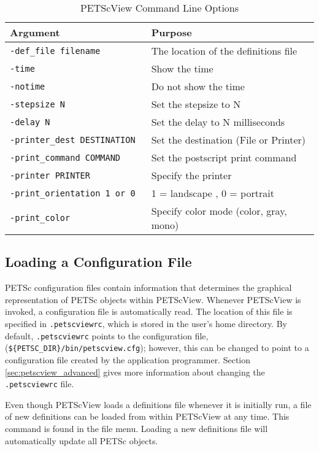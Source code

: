 \begin{table}
\begin{center}
\begin{tabular}{ll}
{\bf Argument}                  & {\bf Purpose} \\
\hline
{\tt -def\_file filename}       & The location of the definitions file \\
{\tt -time}                    & Show the time \\
{\tt -notime}                  & Do not show the time \\
{\tt -stepsize N}              & Set the stepsize to N \\
{\tt -delay N}                 & Set the delay to N milliseconds \\
{\tt -printer\_dest DESTINATION}& Set the destination (File or Printer) \\
{\tt -print\_command COMMAND}   & Set the postscript print command \\
{\tt -printer PRINTER}         & Specify the printer \\
{\tt -print\_orientation 1 or 0} $\:\:\:$ & 1 = landscape , 0 = portrait \\
{\tt -print\_color}             & Specify color mode (color, gray, mono) \\
\hline
\end{tabular}
\end{center}
\caption{PETScView Command Line Options}
\label{PETScView_command_line_options}
\end{table}

\subsection{Loading a Configuration File}

PETSc configuration files contain information that
determines the graphical representation of PETSc objects within PETScView.
Whenever PETScView is invoked, a configuration file
is automatically read.  The location of this file is specified in
{\tt .petscviewrc}, which is stored in the user's home directory.  By
default, {\tt .petscviewrc} points to the configuration file,
({\tt \$\{PETSC\_DIR\}/bin/petscview.cfg}); however, this can be
changed to point to a configuration file created by the application
programmer.  Section \ref{sec:petscview_advanced} gives
more information about changing the {\tt .petscviewrc} file.

Even though PETScView loads a definitions file whenever it is
initially run, a file of new definitions can be loaded from within
PETScView at any time.  This command is found in the file menu.
Loading a new definitions file will automatically update all PETSc
objects.

